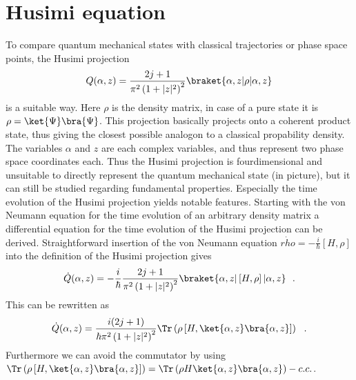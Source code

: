 \section{Husimi equation}
To compare quantum mechanical states with classical trajectories or phase space points, the Husimi projection 
\begin{equation}
  Q(\alpha, z) = \frac{2j + 1}{\pi^2 \left(1 + |z|^2\right)^2} \braket{\alpha, z|\rho|\alpha,z}
\end{equation}
is a suitable way.
Here $\rho$ is the density matrix, in case of a pure state it is $\rho = \ket{\Psi}\bra{\Psi}$.
This projection basically projects onto a coherent product state, thus giving the closest possible analogon to a classical propability density.
The variables $\alpha$ and $z$ are each complex variables, and thus represent two phase space coordinates each.
Thus the Husimi projection is fourdimensional and unsuitable to directly represent the quantum mechanical state (in picture), but it can still be studied regarding fundamental properties.
Especially the time evolution of the Husimi projection yields notable features.
Starting with the von Neumann equation for the time evolution of an arbitrary density matrix a differential equation for the time evolution of the Husimi projection can be derived.
Straightforward insertion of the von Neumann equation $\dot{rho} = -\frac{i}{\hbar} \left[H,\rho\right]$ into the definition of the Husimi projection gives 
\begin{equation}
  \dot{Q} (\alpha, z) = -\frac{i}{\hbar} \frac{2j+1}{\pi^2 \left(1 + |z|^2\right)^2} \braket{\alpha, z|\left[H,\rho\right]|\alpha,z}~~.
\end{equation}
This can be rewritten as
\begin{equation}
  \dot Q(\alpha, z) = \frac{i (2j + 1)}{\hbar \pi^2 \left(1 + |z|^2\right)^2} \Tr\left(\rho \left[H,\ket{\alpha,z}\bra{\alpha,z}\right] \right)~~.\label{eq:Qdot}
\end{equation}
Furthermore we can avoid the commutator by using $\Tr\left(\rho \left[H, \ket{\alpha,z}\bra{\alpha,z} \right]\right)  = \Tr \left( \rho H \ket{\alpha,z}\bra{\alpha,z} \right) - c.c.$.

